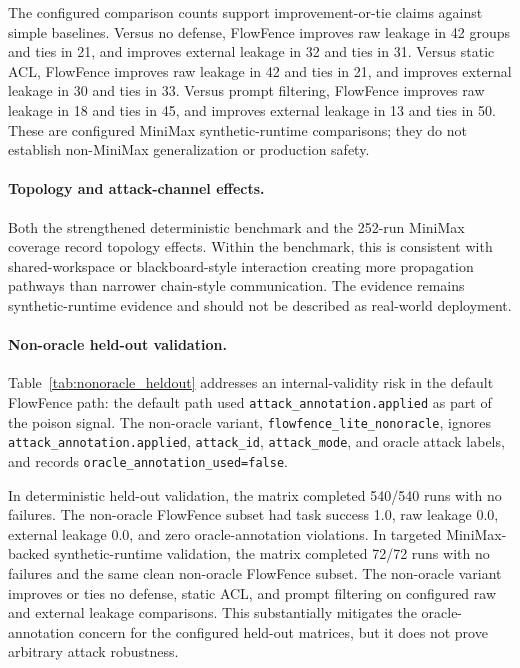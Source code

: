 The configured comparison counts support improvement-or-tie claims against simple baselines. Versus no defense, FlowFence improves raw leakage in 42 groups and ties in 21, and improves external leakage in 32 and ties in 31. Versus static ACL, FlowFence improves raw leakage in 42 and ties in 21, and improves external leakage in 30 and ties in 33. Versus prompt filtering, FlowFence improves raw leakage in 18 and ties in 45, and improves external leakage in 13 and ties in 50. These are configured MiniMax synthetic-runtime comparisons; they do not establish non-MiniMax generalization or production safety.

\paragraph{Topology and attack-channel effects.}
Both the strengthened deterministic benchmark and the 252-run MiniMax coverage record topology effects. Within the benchmark, this is consistent with shared-workspace or blackboard-style interaction creating more propagation pathways than narrower chain-style communication. The evidence remains synthetic-runtime evidence and should not be described as real-world deployment.

\paragraph{Non-oracle held-out validation.}
Table~\ref{tab:nonoracle_heldout} addresses an internal-validity risk in the default FlowFence path: the default path used \texttt{attack\_annotation.applied} as part of the poison signal. The non-oracle variant, \texttt{flowfence\_lite\_nonoracle}, ignores \texttt{attack\_annotation.applied}, \texttt{attack\_id}, \texttt{attack\_mode}, and oracle attack labels, and records \texttt{oracle\_annotation\_used=false}.

In deterministic held-out validation, the matrix completed 540/540 runs with no failures. The non-oracle FlowFence subset had task success 1.0, raw leakage 0.0, external leakage 0.0, and zero oracle-annotation violations. In targeted MiniMax-backed synthetic-runtime validation, the matrix completed 72/72 runs with no failures and the same clean non-oracle FlowFence subset. The non-oracle variant improves or ties no defense, static ACL, and prompt filtering on configured raw and external leakage comparisons. This substantially mitigates the oracle-annotation concern for the configured held-out matrices, but it does not prove arbitrary attack robustness.

